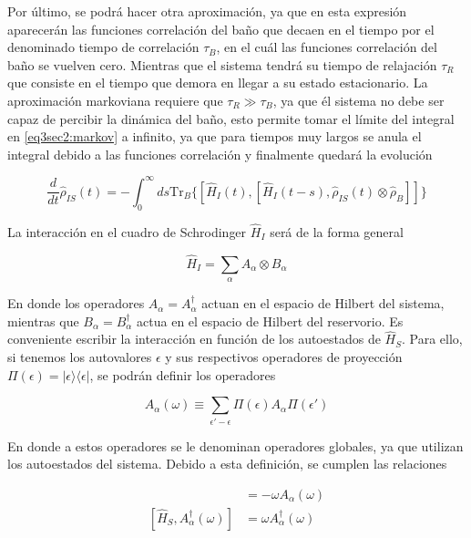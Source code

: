 Por último, se podrá hacer otra aproximación, ya que en esta expresión aparecerán las funciones correlación del baño que decaen en el tiempo por el denominado tiempo de correlación $\tau_{B}$, en el cuál las funciones correlación del baño se vuelven cero. Mientras que el sistema tendrá su tiempo de relajación $\tau_{R}$ que consiste en el tiempo que demora en llegar a su estado estacionario. La aproximación markoviana requiere que $\tau_{R}\gg \tau_{B}$, ya que él sistema no debe ser capaz de percibir la dinámica del baño, esto permite tomar el límite del integral en \ref{eq3sec2:markov} a infinito, ya que para tiempos muy largos se anula el integral debido a las funciones correlación y finalmente quedará la evolución

\begin{equation}
    \frac{d}{dt}\hat{\rho}_{IS}(t) = -  \int_{0}^{\infty}ds \text{Tr}_{B}\{[\hat{H}_{I}(t), [\hat{H}_{I}(t-s),\hat{\rho}_{IS}(t) \otimes \hat{\rho}_{B}]]\}
    \label{eq3sec2:markov1}
\end{equation} 

La interacción en el cuadro de Schrodinger $\hat{H}_{I}$ será de la forma general

\begin{equation*}
    \hat{H}_{I} = \sum_{\alpha}A_{\alpha} \otimes B_{\alpha}
\end{equation*}

En donde los operadores $A_{\alpha} = A^{\dagger}_{\alpha}$ actuan en el espacio de Hilbert del sistema, mientras que $B_{\alpha}=B^{\dagger}_{\alpha}$ actua en el espacio de Hilbert del reservorio. Es conveniente escribir la interacción en función de los autoestados de $\hat{H}_{S}$. Para ello, si tenemos los autovalores $\epsilon$ y sus respectivos operadores de proyección $\Pi(\epsilon) = |\epsilon\rangle \langle \epsilon|$, se podrán definir los operadores

\begin{equation*}
    A_{\alpha}(\omega) \equiv \sum_{\epsilon' - \epsilon}\Pi(\epsilon)A_{\alpha}\Pi(\epsilon') 
\end{equation*}

En donde a estos operadores se le denominan operadores globales, ya que utilizan los autoestados del sistema. Debido a esta definición, se cumplen las relaciones

\begin{align*}
    [\hat{H}_{S},A_{\alpha}(\omega)] & = - \omega A_{\alpha}(\omega) \\
    [\hat{H}_{S},A^{\dagger}_{\alpha}(\omega)] & = \omega A^{\dagger}_{\alpha}(\omega)
\end{align*}

